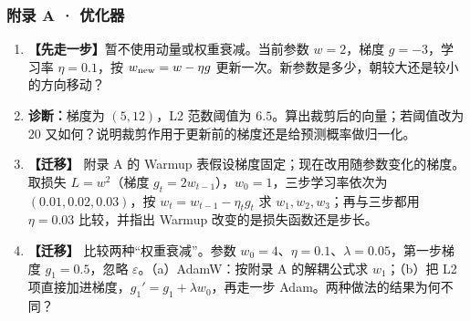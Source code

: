\subsubsection*{附录 A · 优化器}
\begin{enumerate}[label={},leftmargin=4.8em,itemsep=4pt]
\item[\textbf{C-141.}] \leavevmode{}\label{exercise:C-141}\label{exercise:optimizer-basic-step}\textbf{【先走一步】}暂不使用动量或权重衰减。当前参数 $w=2$，梯度 $g=-3$，学习率 $\eta=0.1$，按 $w_{\rm new}=w-\eta g$ 更新一次。新参数是多少，朝较大还是较小的方向移动？
\item[\textbf{C-142.}] \leavevmode{}\label{exercise:C-142}\label{exercise:optimizer-clipping}\textbf{诊断：}梯度为 $(5,12)$，L2 范数阈值为 $6.5$。算出裁剪后的向量；若阈值改为 $20$ 又如何？说明裁剪作用于更新前的梯度还是给预测概率做归一化。
\item[\textbf{C-143.}] \leavevmode{}\label{exercise:C-143}\label{exercise:optimizer-warmup}\label{exercise:warmup-schedule} \textbf{【迁移】} 附录 A 的 Warmup 表假设梯度固定；现在改用随参数变化的梯度。取损失 $L=w^2$（梯度 $g_t=2w_{t-1}$），$w_0=1$，三步学习率依次为 $(0.01,0.02,0.03)$，按 $w_t=w_{t-1}-\eta_tg_t$ 求 $w_1,w_2,w_3$；再与三步都用 $\eta=0.03$ 比较，并指出 Warmup 改变的是损失函数还是步长。
\item[\textbf{C-144.}] \leavevmode{}\label{exercise:C-144}\label{exercise:optimizer-adamw}\label{exercise:adamw-decay} \textbf{【迁移】} 比较两种“权重衰减”。参数 $w_0=4$、$\eta=0.1$、$\lambda=0.05$，第一步梯度 $g_1=0.5$，忽略 $\varepsilon$。（a）AdamW：按附录 A 的解耦公式求 $w_1$；（b）把 L2 项直接加进梯度，$g_1'=g_1+\lambda w_0$，再走一步 Adam。两种做法的结果为何不同？
\end{enumerate}
